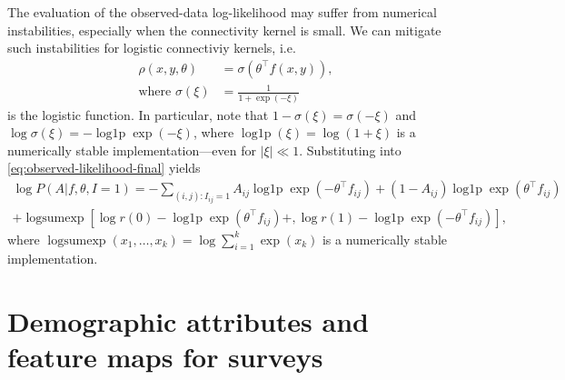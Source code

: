 \documentclass{scrartcl}
\newcommand{\expit}{\sigma}
\newcommand{\transpose}[1]{#1^\intercal}
\DeclareMathOperator{\logp}{log1p}
\DeclareMathOperator{\logsumexp}{logsumexp}
\newcommand{\abs}[1]{\left|#1\right|}
\begin{document}
The evaluation of the observed-data log-likelihood may suffer from numerical instabilities, especially when the connectivity kernel is small. We can mitigate such instabilities for logistic connectiviy kernels, i.e.
\begin{align}
    \rho(x,y,\theta)&=\expit(\transpose{\theta}f(x,y)),\\
    \text{where }\expit(\xi)&=\frac{1}{1+\exp(-\xi)}
\end{align}
is the logistic function. In particular, note that $1 - \expit(\xi) = \expit(-\xi)$ and $\log\expit(\xi)=-\logp\exp(-\xi)$, where $\logp(\xi)=\log(1 + \xi)$ is a numerically stable implementation---even for $\abs{\xi}\ll 1$. Substituting into \cref{eq:observed-likelihood-final} yields
\begin{multline}
    \log P(A|f,\theta,I=1)= -\sum_{(i,j):I_{ij}=1} A_{ij}\logp\exp\left(-\transpose{\theta}f_{ij}\right)+\left(1-A_{ij}\right)\logp\exp\left(\transpose{\theta}f_{ij}\right) \\
    + \logsumexp\left[\log r(0) - \logp\exp\left(\transpose{\theta}f_{ij}\right) + ,\log r(1)-\logp\exp\left(-\transpose{\theta}f_{ij}\right)\right],
\end{multline}
where $\logsumexp(x_1, \ldots, x_k)=\log\sum_{i=1}^k\exp(x_k)$ is a numerically stable implementation.

\section{Demographic attributes and feature maps for surveys}
\end{document}
